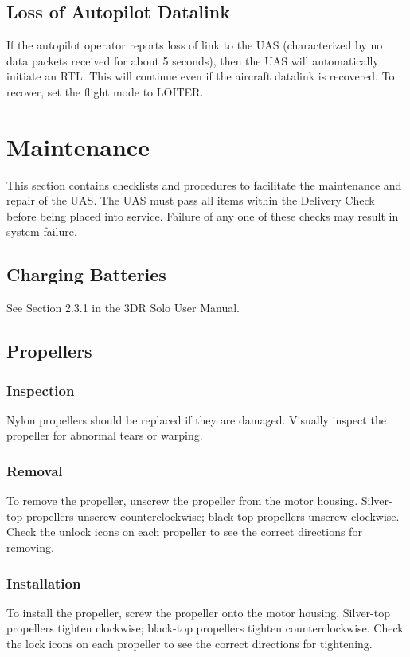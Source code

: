 \documentclass{report}
\begin{document}
	\section{Loss of Autopilot Datalink}
		If the autopilot operator reports loss of link to the \gls{UAS} (characterized by no data packets received for about 5 seconds), then the \gls{UAS} will automatically initiate an \gls{RTL}.  This will continue even if the aircraft datalink is recovered.  To recover, set the flight mode to LOITER.
\chapter{Maintenance}
	This section contains checklists and procedures to facilitate the maintenance and repair of the \gls{UAS}.  The \gls{UAS} must pass all items within the Delivery Check before being placed into service.  Failure of any one of these checks may result in system failure.
	\section{Charging Batteries}
		See Section 2.3.1 in the 3DR Solo User Manual.
	\section{Propellers}
		\subsection{Inspection}
		Nylon propellers should be replaced if they are damaged.  Visually inspect the propeller for abnormal tears or warping.

		\subsection{Removal}
		To remove the propeller, unscrew the propeller from the motor housing.  Silver-top propellers unscrew counterclockwise; black-top propellers unscrew clockwise.  Check the unlock icons on each propeller to see the correct directions for removing.

		\subsection{Installation}
		To install the propeller, screw the propeller onto the motor housing.  Silver-top propellers tighten clockwise; black-top propellers tighten counterclockwise.  Check the lock icons on each propeller to see the correct directions for tightening.
	
\end{document}
